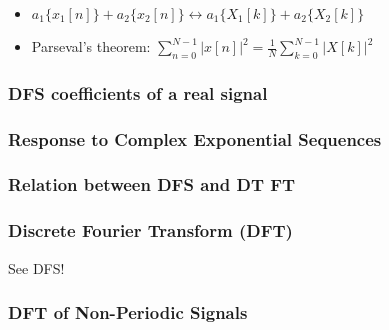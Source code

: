 \documentclass[7pt,a4paper]{scrartcl}
\begin{document}
\begin{multicols*}{4}
\begin{itemize}
\ncompaq
\item $a_1\{x_1[n]\}+a_2\{x_2[n]\}\leftrightarrow a_1\{X_1[k]\}+a_2\{X_2[k]\}$
\item Parseval's theorem: $\sum\limits_{n=0}^{N-1}|x[n]|^2=\frac{1}{N}\sum\limits_{k=0}^{N-1}|X[k]|^2$
\end{itemize}

\subsubsection*{DFS coefficients of a real signal}




\subsubsection*{Response to Complex Exponential Sequences}



\subsubsection*{Relation between DFS and DT FT}


\subsubsection*{Discrete Fourier Transform (DFT)}



See DFS!

\subsubsection*{DFT of Non-Periodic Signals}


\end{multicols*}
\end{document}
